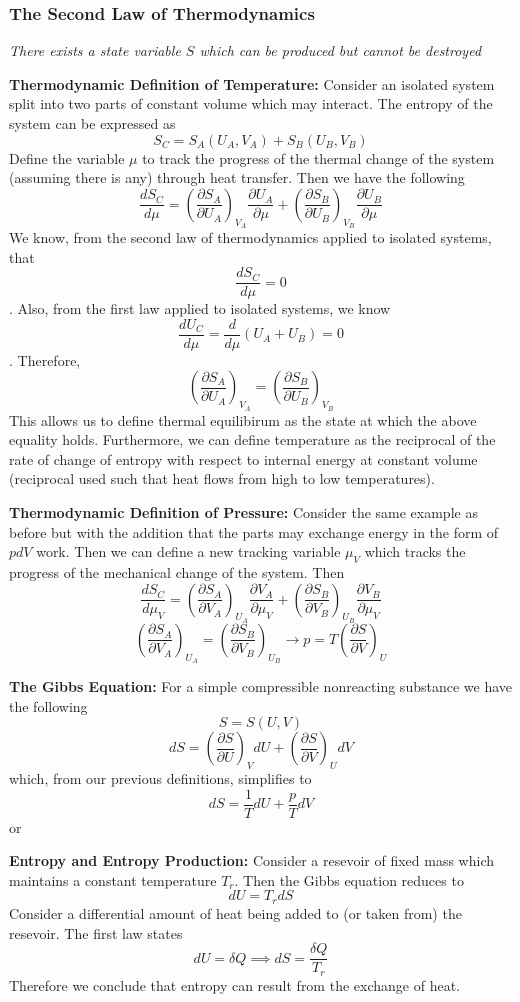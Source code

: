 \documentclass[12pt]{article}
\newcommand{\CenteredBoxed}[1]{\begin{center}\boxed{#1}\end{center}}
\newcommand{\Partial}[2]{\frac{\partial #1}{\partial #2}}
\newcommand{\PartialConst}[3]{\left(\Partial{#1}{#2}\right)_{#3}}
\begin{document}
\subsubsection{The Second Law of Thermodynamics}
\large\emph{There exists a state variable $S$ which can be produced but cannot be destroyed}
\CenteredBoxed{S_2-S_1=\Delta S \geq 0}
\normalsize

\textbf{Thermodynamic Definition of Temperature:}
Consider an isolated system split into two parts of constant volume which may interact. The entropy of the system can be expressed as 
$$S_C=S_A(U_A,V_A) + S_B(U_B,V_B)$$
Define the variable $\mu$ to track the progress of the thermal change of the system (assuming there is any) through heat transfer. Then we have the following
$$\frac{dS_C}{d\mu}=\PartialConst{S_A}{U_A}{V_A}\Partial{U_A}{\mu} + \PartialConst{S_B}{U_B}{V_B}\Partial{U_B}{\mu}$$
We know, from the second law of thermodynamics applied to isolated systems, that $$\frac{dS_C}{d\mu}=0$$. Also, from the first law applied to isolated systems, we know $$\frac{dU_C}{d\mu}=\frac{d}{d\mu}(U_A+U_B)=0$$. Therefore,
$$\PartialConst{S_A}{U_A}{V_A}=\PartialConst{S_B}{U_B}{V_B}$$
This allows us to define thermal equilibirum as the state at which the above equality holds. Furthermore, we can define temperature as the reciprocal of the rate of change of entropy with respect to internal energy at constant volume (reciprocal used such that heat flows from high to low temperatures).
\CenteredBoxed{T=\frac{1}{\left(\partial S/\partial U\right)_{V}}}

\textbf{Thermodynamic Definition of Pressure:}
Consider the same example as before but with the addition that the parts may exchange energy in the form of $pdV$ work.  Then we can define a new tracking variable $\mu_V$ which tracks the progress of the mechanical change of the system. Then
$$\frac{dS_C}{d\mu_V}=\PartialConst{S_A}{V_A}{U_A}\Partial{V_A}{\mu_V} + \PartialConst{S_B}{V_B}{U_B}\Partial{V_B}{\mu_V}$$
$$\PartialConst{S_A}{V_A}{U_A}=\PartialConst{S_B}{V_B}{U_B}\to p = T\PartialConst{S}{V}{U}$$

\textbf{The Gibbs Equation:}
For a simple compressible nonreacting substance we have the following
$$S = S(U,V)$$
$$dS = \PartialConst{S}{U}{V}dU + \PartialConst{S}{V}{U}dV$$
which, from our previous definitions, simplifies to
$$dS = \frac{1}{T}dU + \frac{p}{T}dV$$
or
\CenteredBoxed{dU = TdS - pdV}

\textbf{Entropy and Entropy Production:}
Consider a resevoir of fixed mass which maintains a constant temperature $T_r$. Then the Gibbs equation reduces to
$$dU = T_rdS$$
Consider a differential amount of heat being added to (or taken from) the resevoir. The first law states
$$dU = \delta Q\implies dS = \frac{\delta Q}{T_r}$$
Therefore we conclude that entropy can result from the exchange of heat.
\end{document}
